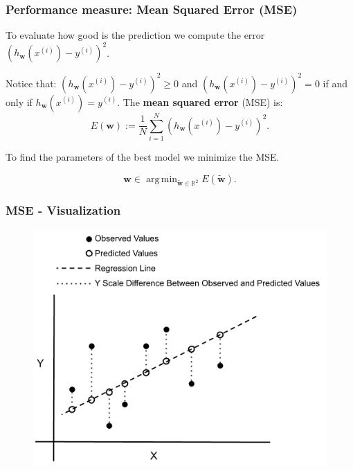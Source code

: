 \documentclass{beamer}
\DeclareMathOperator*{\argmin}{arg\,min}
\begin{document}
	\begin{frame}
		\frametitle{Performance measure: Mean Squared Error (MSE)}
		To evaluate how good is the prediction we compute the error $(h_{\bm{w}}(x^{(i)}) - y^{(i)})^2$.
		
		\vspace{5 mm}
		
		Notice that: $(h_{\bm{w}}(x^{(i)}) - y^{(i)})^2 \geq 0$ and $(h_{\bm{w}}(x^{(i)}) - y^{(i)})^2 = 0$ if and only if $h_{\bm{w}}(x^{(i)}) = y^{(i)}$. The \textbf{mean squared error} (MSE) is:
		$$E({\bm{w}}) := \frac{1}{N} \sum_{i=1}^{N} (h_{\bm{w}}(x^{(i)}) - y^{(i)})^2.$$
		
		To find the parameters of the best model we minimize the MSE.
		
		$$\bm{w} \in \argmin_{\tilde{\bm{w}} \in \mathbb{R}^2} E(\tilde{\bm{w}}).$$
		
	\end{frame}

	\begin{frame}
		\frametitle{MSE - Visualization}
		\begin{figure}
			\centering
			\includegraphics[scale=0.5]{images/mse}
		\end{figure}
	\end{frame}
\end{document}
